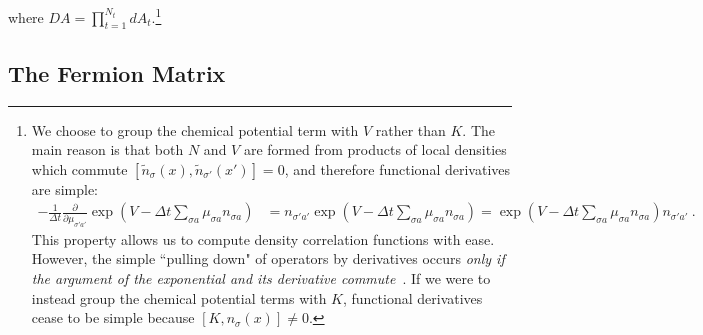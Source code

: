 where $DA = \prod_{t=1}^{N_t} d A_t $.\footnote{
	We choose to group the chemical potential term with $V$ rather than $K$.
	The main reason is that both $N$ and $V$ are formed from products of local densities which commute $[\tilde{n}_{\sigma}(x),\tilde{n}_{\sigma'}(x')] = 0$, and therefore functional derivatives are simple:
	\begin{align*}
		-\frac{1}{\Delta t} \frac{\partial}{\partial \mu_{\sigma 'a'}}\exp\left( V - \Delta t \sum_{\sigma a}\mu_{\sigma a} n_{\sigma a}\right) 
		&
		=  n_{\sigma' a'} \exp\left( V - \Delta t \sum_{\sigma a}\mu_{\sigma a} n_{\sigma a}\right)
		= \exp\left( V - \Delta t \sum_{\sigma a}\mu_{\sigma a} n_{\sigma a}\right) n_{\sigma' a'}~.
	\end{align*} 
	This property allows us to compute density correlation functions with ease.
	However, the simple ``pulling down" of operators by derivatives occurs \emph{only if the argument of the exponential and its derivative commute}~\cite{10.2307/4146900}.
	If we were to instead group the chemical potential terms with $K$, functional derivatives cease to be simple because $[K,n_{\sigma}(x)] \neq 0$.
}

\subsection{The Fermion Matrix}\label{sec:fermion matrix}

